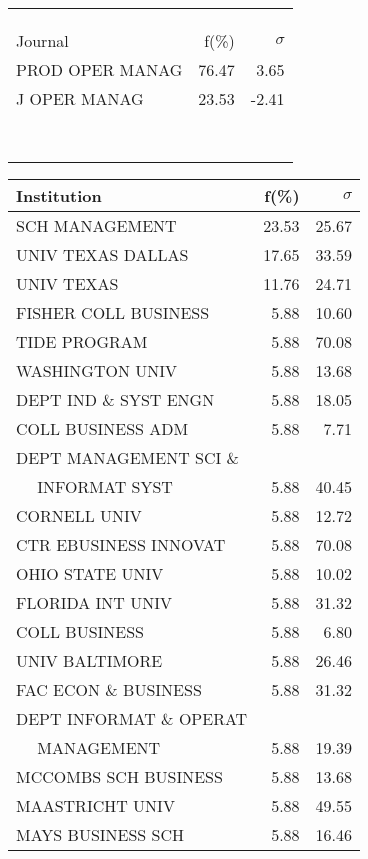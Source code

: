 \documentclass[a4paper,11pt]{report}
\begin{document}
\begin{landscape}
\begin{table}[!ht]
{\begin{tabular}{|l r  r|}
 &  & \\
 &  & \\
 &  & \\
\hline
\hline
Journal & f(\%) & $\sigma$\\
\hline
PROD OPER MANAG & 76.47 & 3.65\\
J OPER MANAG & 23.53 & -2.41\\
 &  & \\
 &  & \\
 &  & \\
 &  & \\
 &  & \\
 &  & \\
 &  & \\
 &  & \\
\hline
\end{tabular}
}
{\scriptsize\begin{tabular}{|l r r|}
\hline
Institution & f(\%) & $\sigma$\\
\hline
SCH MANAGEMENT & 23.53 & 25.67\\
UNIV TEXAS DALLAS & 17.65 & 33.59\\
UNIV TEXAS & 11.76 & 24.71\\
FISHER COLL BUSINESS & 5.88 & 10.60\\
TIDE PROGRAM & 5.88 & 70.08\\
WASHINGTON UNIV & 5.88 & 13.68\\
DEPT IND \& SYST ENGN & 5.88 & 18.05\\
COLL BUSINESS ADM & 5.88 & 7.71\\
DEPT MANAGEMENT SCI \& &  & \\
$\quad$ INFORMAT SYST & 5.88 & 40.45\\
CORNELL UNIV & 5.88 & 12.72\\
CTR EBUSINESS INNOVAT & 5.88 & 70.08\\
OHIO STATE UNIV & 5.88 & 10.02\\
FLORIDA INT UNIV & 5.88 & 31.32\\
COLL BUSINESS & 5.88 & 6.80\\
UNIV BALTIMORE & 5.88 & 26.46\\
FAC ECON \& BUSINESS & 5.88 & 31.32\\
DEPT INFORMAT \& OPERAT &  & \\
$\quad$ MANAGEMENT & 5.88 & 19.39\\
MCCOMBS SCH BUSINESS & 5.88 & 13.68\\
MAASTRICHT UNIV & 5.88 & 49.55\\
MAYS BUSINESS SCH & 5.88 & 16.46\\

\end{tabular}}
\end{table}
\end{landscape}
\end{document}
